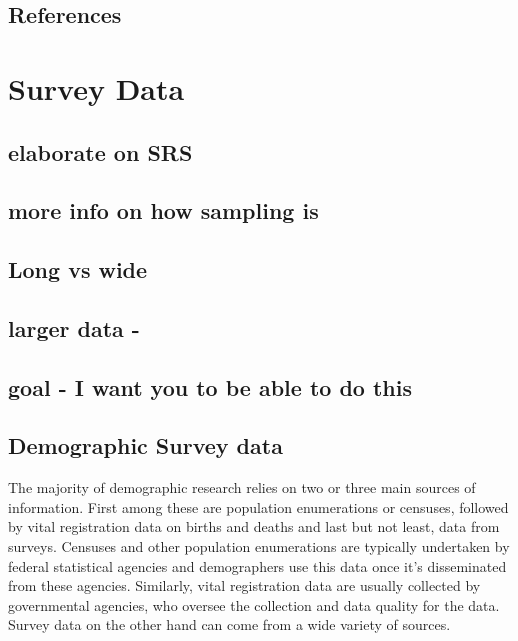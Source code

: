 \documentclass[
]{article}
\begin{document}
\hypertarget{references}{%
\subsection{References}\label{references}}

\newpage

\hypertarget{survey-data}{%
\section{Survey Data}\label{survey-data}}

\hypertarget{elaborate-on-srs}{%
\subsection{elaborate on SRS}\label{elaborate-on-srs}}

\hypertarget{more-info-on-how-sampling-is}{%
\subsection{more info on how sampling is}\label{more-info-on-how-sampling-is}}

\hypertarget{long-vs-wide}{%
\subsection{Long vs wide}\label{long-vs-wide}}

\hypertarget{larger-data--}{%
\subsection{larger data -}\label{larger-data--}}

\hypertarget{goal---i-want-you-to-be-able-to-do-this}{%
\subsection{goal - I want you to be able to do this}\label{goal---i-want-you-to-be-able-to-do-this}}

\hypertarget{demographic-survey-data}{%
\subsection{Demographic Survey data}\label{demographic-survey-data}}

The majority of demographic research relies on two or three main sources of information. First among these are population enumerations or censuses, followed by vital registration data on births and deaths and last but not least, data from surveys. Censuses and other population enumerations are typically undertaken by federal statistical agencies and demographers use this data once it's disseminated from these agencies. Similarly, vital registration data are usually collected by governmental agencies, who oversee the collection and data quality for the data. Survey data on the other hand can come from a wide variety of sources.
\end{document}
